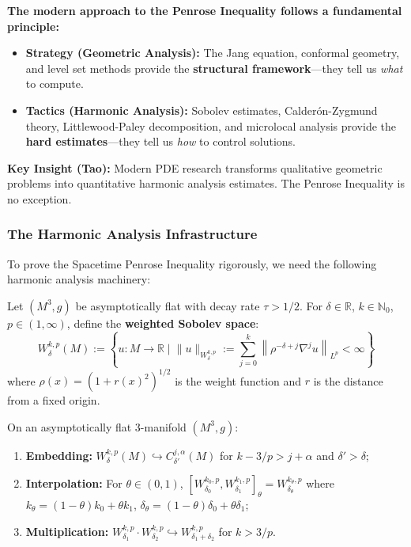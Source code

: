 \begin{remark}
\textbf{The modern approach to the Penrose Inequality follows a fundamental principle:}
\begin{itemize}
\item \textbf{Strategy (Geometric Analysis):} The Jang equation, conformal geometry, and level set methods provide the \textbf{structural framework}---they tell us \emph{what} to compute.
\item \textbf{Tactics (Harmonic Analysis):} Sobolev estimates, Calder\'on-Zygmund theory, Littlewood-Paley decomposition, and microlocal analysis provide the \textbf{hard estimates}---they tell us \emph{how} to control solutions.
\end{itemize}

\textbf{Key Insight (Tao):} Modern PDE research transforms qualitative geometric problems into quantitative harmonic analysis estimates. The Penrose Inequality is no exception.
\end{remark}

\subsubsection{The Harmonic Analysis Infrastructure}

To prove the Spacetime Penrose Inequality rigorously, we need the following harmonic analysis machinery:

\begin{definition}\label{def:weighted-sobolev}
Let $(M^3, g)$ be asymptotically flat with decay rate $\tau > 1/2$. For $\delta \in \mathbb{R}$, $k \in \mathbb{N}_0$, $p \in (1, \infty)$, define the \textbf{weighted Sobolev space}:
\begin{equation}
W^{k,p}_\delta(M) := \left\{ u : M \to \mathbb{R} \;\Big|\; \|u\|_{W^{k,p}_\delta} := \sum_{j=0}^k \left\| \rho^{-\delta + j} \nabla^j u \right\|_{L^p} < \infty \right\}
\end{equation}
where $\rho(x) = (1 + r(x)^2)^{1/2}$ is the weight function and $r$ is the distance from a fixed origin.
\end{definition}

\begin{theorem}\label{thm:weighted-sobolev}
On an asymptotically flat 3-manifold $(M^3, g)$:
\begin{enumerate}
\item \textbf{Embedding:} $W^{k,p}_\delta(M) \hookrightarrow C^{j,\alpha}_{\delta'}(M)$ for $k - 3/p > j + \alpha$ and $\delta' > \delta$;
\item \textbf{Interpolation:} For $\theta \in (0,1)$, $[W^{k_0,p}_{\delta_0}, W^{k_1,p}_{\delta_1}]_\theta = W^{k_\theta, p}_{\delta_\theta}$ where $k_\theta = (1-\theta)k_0 + \theta k_1$, $\delta_\theta = (1-\theta)\delta_0 + \theta \delta_1$;
\item \textbf{Multiplication:} $W^{k,p}_{\delta_1} \cdot W^{k,p}_{\delta_2} \hookrightarrow W^{k,p}_{\delta_1 + \delta_2}$ for $k > 3/p$.
\end{enumerate}
\end{theorem}


